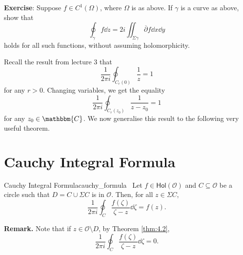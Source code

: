 \documentclass[../ComplexAnalysis_Notes.tex]{subfiles}
\begin{document}
\textbf{Exercise}: Suppose \( f \in C^1(\Omega) \), where \( \Omega \) is as above. If \( \gamma \) is a curve as above, show that
\[
  \oint_\gamma f \dd{z} = 2i \iint_{\Sigma \gamma} \overline{\partial}f \dd{x}\dd{y}
\]
holds for all such functions, without assuming holomorphicity.
\medskip

Recall the result from lecture 3 that
\[
  \frac{1}{2\pi i} \oint_{C_r(0)} \frac{1}{z} = 1
\]
for any \( r > 0 \). Changing variables, we get the equality
\[
  \frac{1}{2\pi i} \oint_{C_r(z_0)} \frac{1}{z-z_0} = 1
\]
for any \( z_0 \in \mathbbm{C} \). We now generalise this result to the following very useful theorem.

\section{Cauchy Integral Formula}

\begin{Thm}{Cauchy Integral Formula}{cauchy_formula}
  \, Let \( f \in \textsf{Hol}(\mathcal{O}) \) and \( C \subseteq \mathcal{O} \) be a circle such that \( D = C \cup \Sigma C \) is in \( \mathcal{O} \). Then, for all \( z \in \Sigma C \),
  \[
    \frac{1}{2\pi i} \oint_C \frac{f(\zeta)}{\zeta-z}\dd{\zeta} = f(z).
  \]
\end{Thm}

\textbf{Remark.} Note that if \( z \in \mathcal{O} \setminus D \), by Theorem \ref{thm:4.2},
\[
  \frac{1}{2\pi i} \oint_C \frac{f(\zeta)}{\zeta-z}\dd{\zeta} = 0.
\]
\end{document}
